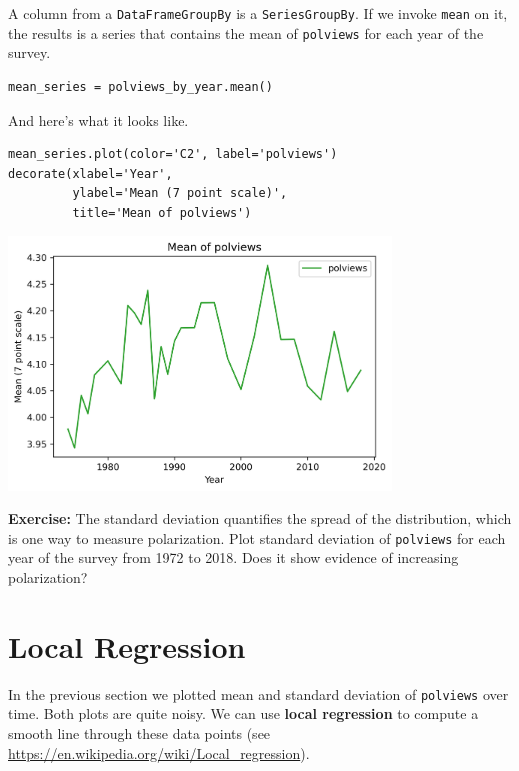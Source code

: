 A column from a \passthrough{\lstinline!DataFrameGroupBy!} is a
\passthrough{\lstinline!SeriesGroupBy!}. If we invoke
\passthrough{\lstinline!mean!} on it, the results is a series that
contains the mean of \passthrough{\lstinline!polviews!} for each year of
the survey.

\begin{lstlisting}[]
mean_series = polviews_by_year.mean()
\end{lstlisting}

And here's what it looks like.

\begin{lstlisting}[]
mean_series.plot(color='C2', label='polviews')
decorate(xlabel='Year', 
         ylabel='Mean (7 point scale)',
         title='Mean of polviews')
\end{lstlisting}

\begin{center}
\includegraphics[width=4in]{chapters/02_polviews_soln_files/02_polviews_soln_50_0.png}
\end{center}

\textbf{Exercise:} The standard deviation quantifies the spread of the
distribution, which is one way to measure polarization. Plot standard
deviation of \passthrough{\lstinline!polviews!} for each year of the
survey from 1972 to 2018. Does it show evidence of increasing
polarization?

\hypertarget{local-regression}{%
\section{Local Regression}\label{local-regression}}

In the previous section we plotted mean and standard deviation of
\passthrough{\lstinline!polviews!} over time. Both plots are quite
noisy. We can use \textbf{local regression} to compute a smooth line
through these data points (see
\url{https://en.wikipedia.org/wiki/Local_regression}).

